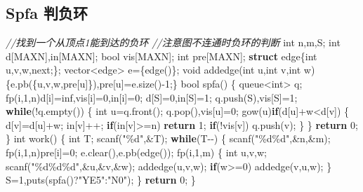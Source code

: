 \documentclass[
]{article}
\newenvironment{Shaded}{}{}
\newcommand{\CommentTok}[1]{\textcolor[rgb]{0.38,0.63,0.69}{\textit{#1}}}
\newcommand{\ControlFlowTok}[1]{\textcolor[rgb]{0.00,0.44,0.13}{\textbf{#1}}}
\newcommand{\DataTypeTok}[1]{\textcolor[rgb]{0.56,0.13,0.00}{#1}}
\newcommand{\DecValTok}[1]{\textcolor[rgb]{0.25,0.63,0.44}{#1}}
\newcommand{\KeywordTok}[1]{\textcolor[rgb]{0.00,0.44,0.13}{\textbf{#1}}}
\newcommand{\NormalTok}[1]{#1}
\newcommand{\SpecialCharTok}[1]{\textcolor[rgb]{0.25,0.44,0.63}{#1}}
\newcommand{\StringTok}[1]{\textcolor[rgb]{0.25,0.44,0.63}{#1}}
\begin{document}
\hypertarget{spfa-ux5224ux8d1fux73af}{%
\subsection{Spfa 判负环}\label{spfa-ux5224ux8d1fux73af}}

\begin{Shaded}
\begin{Highlighting}[]
\CommentTok{//找到一个从顶点1能到达的负环}
\CommentTok{//注意图不连通时负环的判断}
\DataTypeTok{int}\NormalTok{ n,m,S;}
\DataTypeTok{int}\NormalTok{ d[MAXN],in[MAXN];}
\DataTypeTok{bool}\NormalTok{ vis[MAXN];}
\DataTypeTok{int}\NormalTok{ pre[MAXN];}
\KeywordTok{struct}\NormalTok{ edge\{}\DataTypeTok{int}\NormalTok{ u,v,w,next;\};}
\NormalTok{vector\textless{}edge\textgreater{} e=\{edge()\};}
\DataTypeTok{void}\NormalTok{ addedge(}\DataTypeTok{int}\NormalTok{ u,}\DataTypeTok{int}\NormalTok{ v,}\DataTypeTok{int}\NormalTok{ w)\{e.pb(\{u,v,w,pre[u]\}),pre[u]=e.size(){-}}\DecValTok{1}\NormalTok{;\}}
\DataTypeTok{bool}\NormalTok{ spfa()}
\NormalTok{\{}
\NormalTok{    queue\textless{}}\DataTypeTok{int}\NormalTok{\textgreater{} q;}
\NormalTok{    fp(i,}\DecValTok{1}\NormalTok{,n)d[i]=inf,vis[i]=}\DecValTok{0}\NormalTok{,in[i]=}\DecValTok{0}\NormalTok{;}
\NormalTok{    d[S]=}\DecValTok{0}\NormalTok{,in[S]=}\DecValTok{1}\NormalTok{;}
\NormalTok{    q.push(S),vis[S]=}\DecValTok{1}\NormalTok{;}
    \ControlFlowTok{while}\NormalTok{(!q.empty())}
\NormalTok{    \{ }
        \DataTypeTok{int}\NormalTok{ u=q.front();}
\NormalTok{        q.pop(),vis[u]=}\DecValTok{0}\NormalTok{;}
\NormalTok{        gow(u)}\ControlFlowTok{if}\NormalTok{(d[u]+w\textless{}d[v])}
\NormalTok{        \{}
\NormalTok{            d[v]=d[u]+w;}
\NormalTok{            in[v]++; }\ControlFlowTok{if}\NormalTok{(in[v]\textgreater{}=n) }\ControlFlowTok{return} \DecValTok{1}\NormalTok{;}
            \ControlFlowTok{if}\NormalTok{(!vis[v]) q.push(v);}
\NormalTok{        \}}
\NormalTok{    \}}
    \ControlFlowTok{return} \DecValTok{0}\NormalTok{;}
\NormalTok{\}}
\DataTypeTok{int}\NormalTok{ work()}
\NormalTok{\{}
    \DataTypeTok{int}\NormalTok{ T;}
\NormalTok{    scanf(}\StringTok{"}\SpecialCharTok{\%d}\StringTok{"}\NormalTok{,\&T);}
    \ControlFlowTok{while}\NormalTok{(T{-}{-})}
\NormalTok{    \{}
\NormalTok{        scanf(}\StringTok{"}\SpecialCharTok{\%d\%d}\StringTok{"}\NormalTok{,\&n,\&m);}
\NormalTok{        fp(i,}\DecValTok{1}\NormalTok{,n)pre[i]=}\DecValTok{0}\NormalTok{;}
\NormalTok{        e.clear(),e.pb(edge());}
\NormalTok{        fp(i,}\DecValTok{1}\NormalTok{,m)}
\NormalTok{        \{}
            \DataTypeTok{int}\NormalTok{ u,v,w;}
\NormalTok{            scanf(}\StringTok{"}\SpecialCharTok{\%d\%d\%d}\StringTok{"}\NormalTok{,\&u,\&v,\&w);}
\NormalTok{            addedge(u,v,w);}
            \ControlFlowTok{if}\NormalTok{(w\textgreater{}=}\DecValTok{0}\NormalTok{) addedge(v,u,w);}
\NormalTok{        \}}
\NormalTok{        S=}\DecValTok{1}\NormalTok{,puts(spfa()?}\StringTok{"YE5"}\NormalTok{:}\StringTok{"N0"}\NormalTok{);}
\NormalTok{    \}}
    \ControlFlowTok{return} \DecValTok{0}\NormalTok{;}
\NormalTok{\}}
\end{Highlighting}
\end{Shaded}
\end{document}
